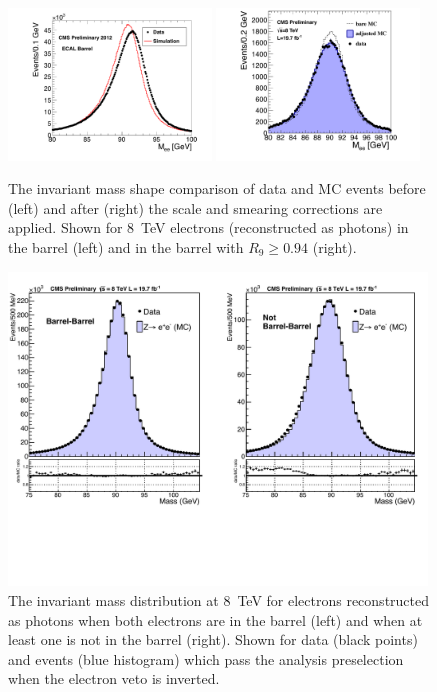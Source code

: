 \begin{figure}
  \includegraphics[width=0.48\textwidth]{analysis_comps/plots/zee_beforecorr_fix.pdf}
  \includegraphics[width=0.48\textwidth]{analysis_comps/plots/zee_aftercorr_fix.pdf}
  \caption[The \Zee invariant mass shape before and after scale and smearing corrections are applied]{The \Zee invariant mass shape comparison of data and MC events before (left) and after (right) the scale and smearing corrections are applied. Shown for 8~TeV electrons (reconstructed as photons) in the barrel (left) and in the barrel with $R_{9}\geq0.94$ (right).}
  \label{fig:scale_smearing_Zee}
\end{figure}

\begin{figure}
  \includegraphics[width=0.99\textwidth]{analysis_comps/plots/massEBEE_fix.pdf}
  \caption[The \Zee invariant mass distribution at 8~TeV when the electrons are reconstructed as photons]{The \Zee invariant mass distribution at 8~TeV for electrons reconstructed as photons when both electrons are in the barrel (left) and when at least one is not in the barrel (right). Shown for data (black points) and \MC events (blue histogram) which pass the analysis preselection when the electron veto is inverted.}
  \label{fig:scale_smearing_analysis}
\end{figure}

